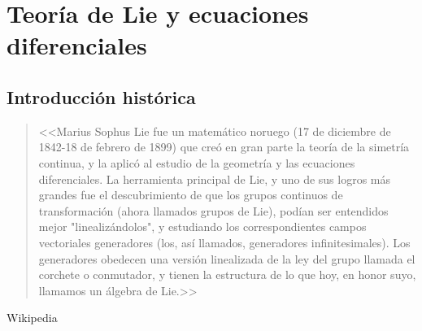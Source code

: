 \chapter{Teoría de Lie y ecuaciones diferenciales}

% 
\section{Introducción histórica}




\begin{quote}
<<Marius Sophus Lie fue un matemático noruego (17 de diciembre de 1842-18 de febrero de 1899) que creó en gran parte la teoría de la simetría continua, y la aplicó al estudio de la geometría y las ecuaciones diferenciales.
La herramienta principal de Lie, y uno de sus logros más grandes fue el descubrimiento de que los grupos continuos de transformación (ahora llamados grupos de Lie), podían ser
 entendidos mejor "linealizándolos", y estudiando los correspondientes campos vectoriales generadores (los, así llamados, generadores infinitesimales).
Los generadores obedecen una versión linealizada de la ley del grupo llamada el corchete o conmutador, y tienen la estructura de lo que hoy, en honor suyo, llamamos un álgebra de Lie.>>
\end{quote}

\begin{flushright}
Wikipedia
\end{flushright}


